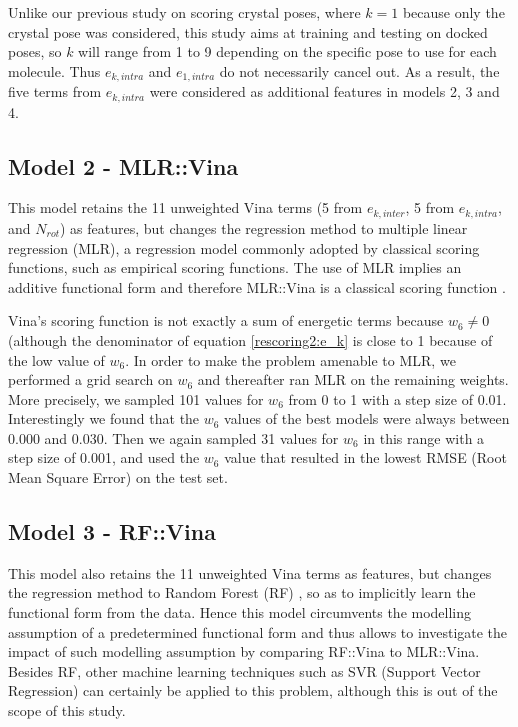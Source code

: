 \documentclass[twocolumn]{bmcart}
\begin{document}
Unlike our previous study \cite{1647} on scoring crystal poses, where $k=1$ because only the crystal pose was considered, this study aims at training and testing on docked poses, so $k$ will range from 1 to 9 depending on the specific pose to use for each molecule. Thus $e_{k,intra}$ and $e_{1,intra}$ do not necessarily cancel out. As a result, the five terms from $e_{k,intra}$ were considered as additional features in models 2, 3 and 4.

\subsection*{Model 2 - MLR::Vina}

This model retains the 11 unweighted Vina terms (5 from $e_{k,inter}$, 5 from $e_{k,intra}$, and $N_{rot}$) as features, but changes the regression method to multiple linear regression (MLR), a regression model commonly adopted by classical scoring functions, such as empirical scoring functions. The use of MLR implies an additive functional form and therefore MLR::Vina is a classical scoring function \cite{1647}.

Vina's scoring function is not exactly a sum of energetic terms because $w_6\neq0$ (although the denominator of equation \ref{rescoring2:e_k} is close to 1 because of the low value of $w_6$. In order to make the problem amenable to MLR, we performed a grid search on $w_6$ and thereafter ran MLR on the remaining weights. More precisely, we sampled 101 values for $w_6$ from 0 to 1 with a step size of 0.01. Interestingly we found that the $w_6$ values of the best models were always between 0.000 and 0.030. Then we again sampled 31 values for $w_6$ in this range with a step size of 0.001, and used the $w_6$ value that resulted in the lowest RMSE (Root Mean Square Error) on the test set.

\subsection*{Model 3 - RF::Vina}

This model also retains the 11 unweighted Vina terms as features, but changes the regression method to Random Forest (RF) \cite{1309}, so as to implicitly learn the functional form from the data. Hence this model circumvents the modelling assumption of a predetermined functional form and thus allows to investigate the impact of such modelling assumption by comparing RF::Vina to MLR::Vina. Besides RF, other machine learning techniques such as SVR (Support Vector Regression) \cite{1295} can certainly be applied to this problem, although this is out of the scope of this study.
\end{document}

